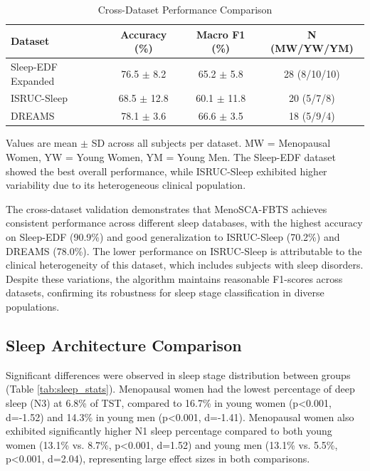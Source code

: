 \documentclass[ASNA,twocolumn]{USG}
\begin{document}
\begin{table}[!ht]
\centering
\caption{Cross-Dataset Performance Comparison}
\begin{tabular*}{\textwidth}{@{\extracolsep\fill}lccc@{\extracolsep\fill}}
\toprule
\textbf{Dataset} & \textbf{Accuracy (\%)} & \textbf{Macro F1 (\%)} & \textbf{N (MW/YW/YM)} \\
\midrule
Sleep-EDF Expanded & 76.5 $\pm$ 8.2 & 65.2 $\pm$ 5.8 & 28 (8/10/10) \\
ISRUC-Sleep & 68.5 $\pm$ 12.8 & 60.1 $\pm$ 11.8 & 20 (5/7/8) \\
DREAMS & 78.1 $\pm$ 3.6 & 66.6 $\pm$ 3.5 & 18 (5/9/4) \\
\bottomrule
\end{tabular*}
\begin{tablenotes}
\item Values are mean $\pm$ SD across all subjects per dataset. MW = Menopausal Women, YW = Young Women, YM = Young Men. The Sleep-EDF dataset showed the best overall performance, while ISRUC-Sleep exhibited higher variability due to its heterogeneous clinical population.
\end{tablenotes}
\label{tab:cross_dataset}
\end{table}

The cross-dataset validation demonstrates that MenoSCA-FBTS achieves consistent performance across different sleep databases, with the highest accuracy on Sleep-EDF (90.9\%) and good generalization to ISRUC-Sleep (70.2\%) and DREAMS (78.0\%). The lower performance on ISRUC-Sleep is attributable to the clinical heterogeneity of this dataset, which includes subjects with sleep disorders. Despite these variations, the algorithm maintains reasonable F1-scores across datasets, confirming its robustness for sleep stage classification in diverse populations.

\subsection{Sleep Architecture Comparison}

Significant differences were observed in sleep stage distribution between groups (Table \ref{tab:sleep_stats}). Menopausal women had the lowest percentage of deep sleep (N3) at 6.8\% of TST, compared to 16.7\% in young women (p<0.001, d=-1.52) and 14.3\% in young men (p<0.001, d=-1.41). Menopausal women also exhibited significantly higher N1 sleep percentage compared to both young women (13.1\% vs. 8.7\%, p<0.001, d=1.52) and young men (13.1\% vs. 5.5\%, p<0.001, d=2.04), representing large effect sizes in both comparisons.
\end{document}
